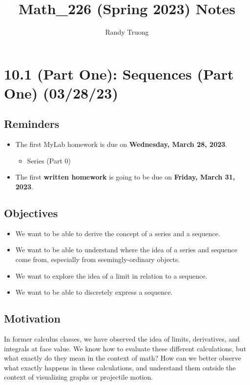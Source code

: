 \documentclass{report}
\title{Math\_226 (Spring 2023) Notes}
\author{Randy Truong}
\begin{document}
\maketitle
\begin{sloppypar}
  \tableofcontents

\chapter{10.1 (Part One): Sequences (Part One) (03/28/23)}
\section{Reminders}
\begin{itemize}
  \item The first MyLab homework is due on
        \textbf{Wednesday, March 28, 2023}.
        \begin{itemize}
                \item Series (Part 0)
        \end{itemize}
  \item The first \textbf{written homework} is going to
        be due on \textbf{Friday, March 31, 2023}.

\end{itemize}

\section{Objectives}
\begin{itemize}
  \item We want to be able to derive the concept of a
        series and a sequence.
  \item We want to be able to understand
        where the idea of a series and sequence come from,
        especially from seemingly-ordinary objects.
  \item We want to explore the idea of a limit
        in relation to a sequence.
  \item We want to be able to discretely express
        a sequence.

\end{itemize}

\section{Motivation}
In former calculus classes, we have observed the idea of limits, derivatives, and integrals at face value. We
know how to evaluate these different calculations, but
what exactly do they mean in the context of math? How can
we better observe what exactly happens in these calculations,
and understand them outside the context of visualizing graphs
or projectile motion.

\end{sloppypar}
\end{document}
